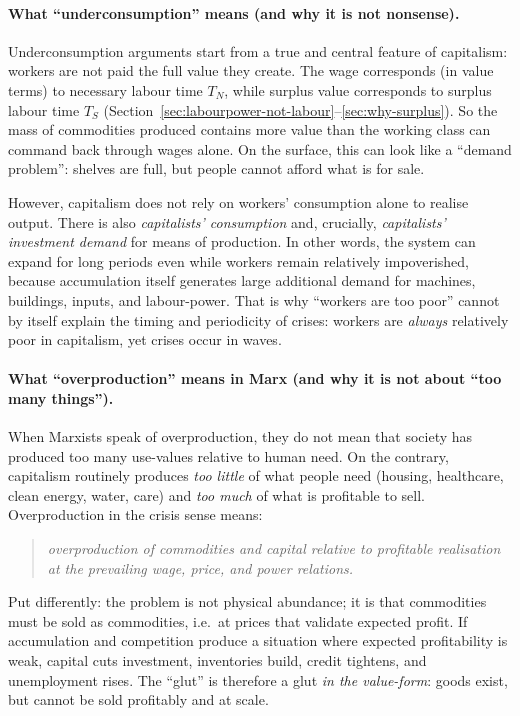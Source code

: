 \paragraph{What “underconsumption” means (and why it is not nonsense).}
Underconsumption arguments start from a true and central feature of capitalism:
workers are not paid the full value they create.
The wage corresponds (in value terms) to necessary labour time $T_N$, while surplus value
corresponds to surplus labour time $T_S$ (Section~\ref{sec:labourpower-not-labour}--\ref{sec:why-surplus}).
So the mass of commodities produced contains more value than the working class can
command back through wages alone.
On the surface, this can look like a “demand problem”: shelves are full, but people cannot
afford what is for sale.

However, capitalism does not rely on workers’ consumption alone to realise output.
There is also \emph{capitalists’ consumption} and, crucially, \emph{capitalists’ investment demand}
for means of production.
In other words, the system can expand for long periods even while workers remain
relatively impoverished, because accumulation itself generates large additional demand for
machines, buildings, inputs, and labour-power.
That is why “workers are too poor” cannot by itself explain the timing and periodicity of
crises: workers are \emph{always} relatively poor in capitalism, yet crises occur in waves.

\paragraph{What “overproduction” means in Marx (and why it is not about “too many things”).}
When Marxists speak of overproduction, they do not mean that society has produced too
many use-values relative to human need.
On the contrary, capitalism routinely produces \emph{too little} of what people need (housing,
healthcare, clean energy, water, care) and \emph{too much} of what is profitable to sell.
Overproduction in the crisis sense means:
\begin{quote}
\emph{overproduction of commodities and capital relative to profitable realisation at the
prevailing wage, price, and power relations.}
\end{quote}
Put differently: the problem is not physical abundance; it is that commodities must be sold
as commodities, i.e.\ at prices that validate expected profit.
If accumulation and competition produce a situation where expected profitability is weak,
capital cuts investment, inventories build, credit tightens, and unemployment rises.
The “glut” is therefore a glut \emph{in the value-form}: goods exist, but cannot be sold
profitably and at scale.

